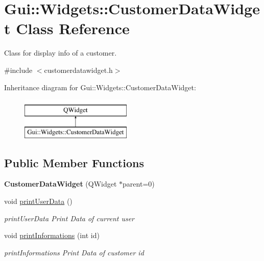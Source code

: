 \hypertarget{classGui_1_1Widgets_1_1CustomerDataWidget}{\section{Gui\-:\-:Widgets\-:\-:Customer\-Data\-Widget Class Reference}
\label{classGui_1_1Widgets_1_1CustomerDataWidget}
}


Class for display info of a customer.  




{\ttfamily \#include $<$customerdatawidget.\-h$>$}

Inheritance diagram for Gui\-:\-:Widgets\-:\-:Customer\-Data\-Widget\-:\begin{figure}[H]
\begin{center}
\leavevmode
\includegraphics[height=2.000000cm]{df/deb/classGui_1_1Widgets_1_1CustomerDataWidget}
\end{center}
\end{figure}
\subsection*{Public Member Functions}
\begin{DoxyCompactItemize}
\item 
\hypertarget{classGui_1_1Widgets_1_1CustomerDataWidget_a649d25216952fa8642b22983a07c9186}{{\bfseries Customer\-Data\-Widget} (Q\-Widget $\ast$parent=0)}\label{classGui_1_1Widgets_1_1CustomerDataWidget_a649d25216952fa8642b22983a07c9186}

\item 
\hypertarget{classGui_1_1Widgets_1_1CustomerDataWidget_a78504b749fc7d80302c27748a4033b1f}{void \hyperlink{classGui_1_1Widgets_1_1CustomerDataWidget_a78504b749fc7d80302c27748a4033b1f}{print\-User\-Data} ()}\label{classGui_1_1Widgets_1_1CustomerDataWidget_a78504b749fc7d80302c27748a4033b1f}

\begin{DoxyCompactList}\small\item\em print\-User\-Data Print Data of current user \end{DoxyCompactList}\item 
void \hyperlink{classGui_1_1Widgets_1_1CustomerDataWidget_aa995ed95c5ca119db4258af2fe403691}{print\-Informations} (int id)
\begin{DoxyCompactList}\small\item\em print\-Informations Print Data of customer id \end{DoxyCompactList}\end{DoxyCompactItemize}


